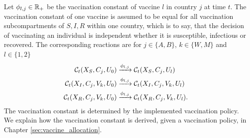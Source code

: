 Let $\phi_{l,j} \in \mathbb{R}_+$ be the vaccination constant of vaccine $l$ in country $j$ at time $t$. The vaccination constant of one vaccine is assumed to be equal for all vaccination subcompartments of $S, I,R$ within one country, which is to say, that the decision of vaccinating an individual is independent whether it is susceptible, infectious or recovered.  The corresponding reactions are for $j \in \{A,B\}$, $k \in \{W,M\}$ and $l \in \{1,2\}$
\begin{align}
\mathcal{C}_t(X_S, C_j, U_0) &\xrightarrow{\phi_{l, j}} \mathcal{C}_t(X_S, C_j, U_l)  \\
\mathcal{C}_t(X_I, C_j, V_k, U_0) &\xrightarrow{\phi_{l,j}} \mathcal{C}_t(X_I, C_j, V_k, U_l) \notag \\
\mathcal{C}_t(X_R, C_j, V_k, U_0) &\xrightarrow{\phi_{l,j}} \mathcal{C}_t(X_R, C_j, V_k, U_l). \notag
\end{align}
The vaccination constant is determined by the implemented vaccination policy. We explain how the vaccination constant is derived, given a vaccination policy, in Chapter \ref{sec:vaccine_allocation}.


